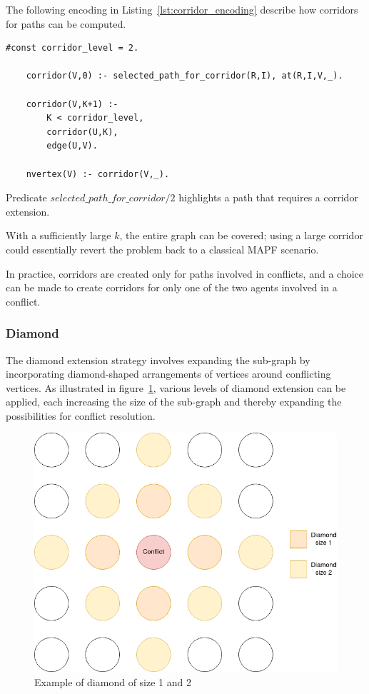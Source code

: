 The following encoding in Listing~\ref{lst:corridor_encoding} describe how corridors for paths can be computed.

\begin{minipage}[H]{\linewidth}
\begin{lstlisting}[style=mystyle, caption={Corridor extension encoding}, label={lst:corridor_encoding}]
    #const corridor_level = 2.

    corridor(V,0) :- selected_path_for_corridor(R,I), at(R,I,V,_).
    
    corridor(V,K+1) :- 
        K < corridor_level,
        corridor(U,K),
        edge(U,V).

    nvertex(V) :- corridor(V,_).
\end{lstlisting}
\end{minipage}

Predicate \(selected\_path\_for\_corridor/2\) highlights a path that requires a corridor extension.

With a sufficiently large \(k\), the entire graph can be covered; using a large corridor could essentially revert the problem back to a classical MAPF scenario.

In practice, corridors are created only for paths involved in conflicts, and a choice can be made to create corridors for only one of the two agents involved in a conflict.

\subsubsection{Diamond}

The diamond extension strategy involves expanding the sub-graph by incorporating diamond-shaped arrangements of vertices around conflicting vertices. As illustrated in figure~\ref{img:diamond}, various levels of diamond extension can be applied, each increasing the size of the sub-graph and thereby expanding the possibilities for conflict resolution.

\begin{figure}[H]
  \centering
  \caption{Example of diamond of size 1 and 2}\label{img:diamond}
  \includegraphics[width=\widthimg]{img/diamond.drawio.png}
\end{figure}


